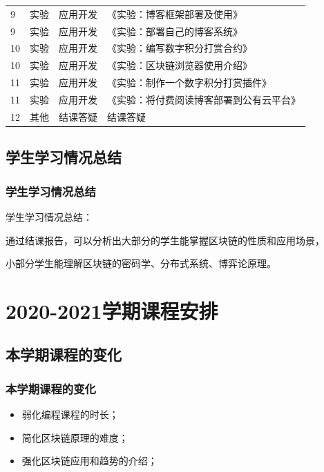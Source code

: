 \documentclass[11pt]{beamer}
\begin{document}
\begin{frame}[allowframebreaks]
\begin{longtable}{llll}
		9  & 实验     & 应用开发   & 《实验：博客框架部署及使用》                       \\
		9  & 实验     & 应用开发   & 《实验：部署自己的博客系统》                       \\
		10 & 实验     & 应用开发   & 《实验：编写数字积分打赏合约》                     \\
		10 & 实验     & 应用开发   & 《实验：区块链浏览器使用介绍》                     \\
		11 & 实验     & 应用开发   & 《实验：制作一个数字积分打赏插件》                 \\
		11 & 实验     & 应用开发   & \small{《实验：将付费阅读博客部署到公有云平台》}   \\
		12 & 其他     & 结课答疑   & 结课答疑                                           \\ \hline
	\end{longtable}
\end{frame}

\subsection{学生学习情况总结}
\begin{frame}
	\frametitle{学生学习情况总结}
	学生学习情况总结：

	通过结课报告，可以分析出大部分的学生能掌握区块链的性质和应用场景，

	小部分学生能理解区块链的密码学、分布式系统、博弈论原理。
\end{frame}

\section{2020-2021学期课程安排}
\subsection{本学期课程的变化}
\begin{frame}
	\frametitle{本学期课程的变化}
	\begin{itemize}
		\item 弱化编程课程的时长；
		\item 简化区块链原理的难度；
		\item 强化区块链应用和趋势的介绍；
	\end{itemize}
\end{frame}
\end{document}
